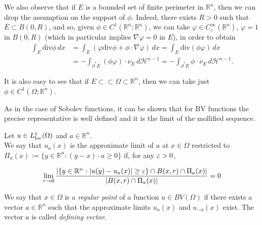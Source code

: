\begin{remark} \label{G-G fin per bounded} We also observe that if $E$ is a bounded set of finite perimeter in $\mathbb{R}^{n}$, then we can drop the assumption on the support of $\phi$. Indeed, there exists $R > 0$ such that $\overline{E} \subset B(0, R)$, and so, given $\phi \in C^{1}(\mathbb{R}^{n}; \mathbb{R}^{n})$, we can take $\varphi \in C^{\infty}_{c}(\mathbb{R}^{n})$, $\varphi = 1$ in $\overline{B(0, R)}$ (which in particular implies $\nabla \varphi = 0$ in $E$), in order to obtain
\begin{align*} \int_{E} \mathrm{div} \phi \, dx & = \int_{E} (\varphi \mathrm{div}\phi + \phi \cdot \nabla \varphi) \, dx = \int_{E} \mathrm{div}(\phi \varphi) \, dx \\
& = - \int_{\partial^{*} E} (\phi \varphi) \cdot \nu_{E}\, d\mathcal{H}^{n-1} = - \int_{\partial^{*} E} \phi \cdot \nu_{E}\, d\mathcal{H}^{n-1}. 
\end{align*}

It is also easy to see that if $E \subset \subset \Omega \subset \mathbb{R}^{n}$, then we can take just $\phi \in C^{1}(\Omega; \mathbb{R}^{n})$.
\end{remark}

As in the case of Sobolev functions, it can be shown that for BV functions the precise representative is well defined and it is the limit of the mollified sequence.

\begin{definition} \label{approxlimrestr} Let $u \in L^{1}_{\rm loc}(\Omega)$ and $a \in \mathbb{R}^{n}$. 
\\
We say that $u_{a}(x)$ is the approximate limit of $u$ at $x \in \Omega$ restricted to $\Pi_{a}(x) := \{y \in \mathbb{R}^{n} : (y - x) \cdot a \ge 0 \}$ if, for any $\varepsilon > 0$,

\[\lim_{r \to 0} \frac{|\{y \in \mathbb{R}^{n} : |u(y) - u_{a}(x)| \ge \varepsilon \} \cap B(x,r) \cap \Pi_{a}(x)|}{|B(x,r) \cap \Pi_{a}(x)|} = 0 \]
\end{definition}
\begin{definition} We say that $x \in \Omega$ is a {\em regular point} of a function $u \in BV(\Omega)$ if there exists a vector $a \in \mathbb{R}^{n}$ such that the approximate limits $u_{a}(x)$ and $u_{-a}(x)$ exist. The vector $a$ is called {\em defining vector}.
\end{definition}


